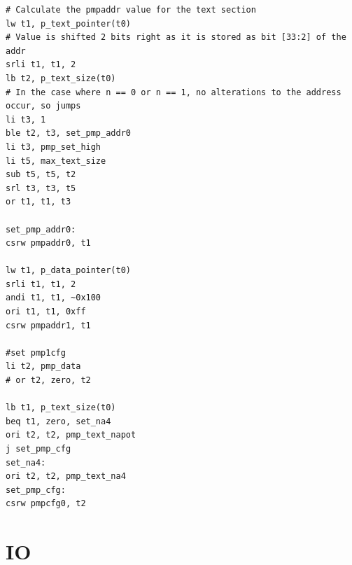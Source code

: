 \newpage
\begin{lstlisting}[language={[RISC-V]Assembler}]
# Calculate the pmpaddr value for the text section
lw t1, p_text_pointer(t0)
# Value is shifted 2 bits right as it is stored as bit [33:2] of the addr
srli t1, t1, 2
lb t2, p_text_size(t0)
# In the case where n == 0 or n == 1, no alterations to the address occur, so jumps
li t3, 1
ble t2, t3, set_pmp_addr0
li t3, pmp_set_high
li t5, max_text_size
sub t5, t5, t2
srl t3, t3, t5
or t1, t1, t3

set_pmp_addr0:
csrw pmpaddr0, t1

lw t1, p_data_pointer(t0)
srli t1, t1, 2
andi t1, t1, ~0x100
ori t1, t1, 0xff
csrw pmpaddr1, t1

#set pmp1cfg
li t2, pmp_data
# or t2, zero, t2

lb t1, p_text_size(t0)
beq t1, zero, set_na4
ori t2, t2, pmp_text_napot
j set_pmp_cfg
set_na4:
ori t2, t2, pmp_text_na4
set_pmp_cfg:
csrw pmpcfg0, t2
\end{lstlisting}
\section{IO}
